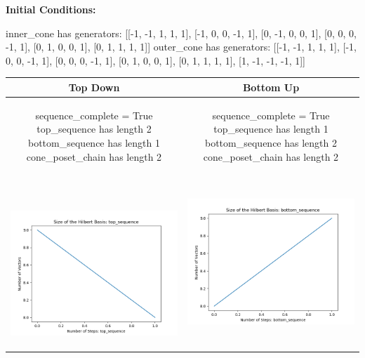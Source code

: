 \documentclass[10pt]{article}
\begin{document}
\textbf{Initial Conditions:}
\begin{SAGE}
inner_cone has generators: 
[[-1, -1, 1, 1, 1], [-1, 0, 0, -1, 1], [0, -1, 0, 0, 1], [0, 0, 0, -1, 1], [0, 1, 0, 0, 1], [0, 1, 1, 1, 1]]
outer_cone has generators: 
[[-1, -1, 1, 1, 1], [-1, 0, 0, -1, 1], [0, 0, 0, -1, 1], [0, 1, 0, 0, 1], [0, 1, 1, 1, 1], [1, -1, -1, -1, 1]]

\end{SAGE}
\begin{tabular}{c|c}
\textbf{Top Down} & \textbf{Bottom Up} \\ \hline  
\begin{SAGE}
	sequence_complete = True
	top_sequence has length 2
	bottom_sequence has length 1
	cone_poset_chain has length 2
\end{SAGE} 
&
\begin{SAGE}
	sequence_complete = True
	top_sequence has length 1
	bottom_sequence has length 2
	cone_poset_chain has length 2
\end{SAGE} 
\\ \hline
\
\begin{minipage}{.45\textwidth}
\includegraphics[width=\textwidth]{"DATA/5d/6 generators 1 bound C/top_sequence SIZE"}
\end{minipage} &
\begin{minipage}{.45\textwidth}
\includegraphics[width=\textwidth]{"DATA/5d/6 generators 1 bound C bottomup/bottom_sequence SIZE"}

\end{minipage}
\end{tabular}
\end{document}
